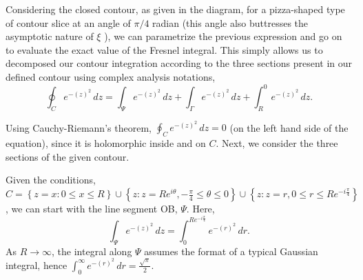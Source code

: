 \documentclass{article}
\begin{document}
Considering the closed contour, as given in the diagram, for a pizza-shaped type of contour slice at an angle of $\pi/4$ radian (this angle also buttresses the asymptotic nature of $\xi$ \cite{Tiscareno_2007}), we can parametrize the previous expression and go on to evaluate the exact value of the Fresnel integral. This simply allows us to decomposed our contour integration according to the three sections present in our defined contour using complex analysis notations,
\begin{equation}
    \oint_{C} e^{-(z)^{2}} \, dz = \int_{\Psi} e^{-(z)^{2}} \, dz + \int_{\Gamma} e^{-(z)^{2}} \, dz + \int_{R}^{0} e^{-(z)^{2}} \, dz.
\end{equation}


Using Cauchy-Riemann's theorem, $\oint_{C} e^{-(z)^{2}} \, dz = 0$ (on the left hand side of the equation), since it is holomorphic inside and on $C$. Next, we consider the three sections of the given contour.

Given the conditions, $C = \left\{ z = x : 0 \leq x \leq R \right\} \cup \left\{ z : z = Re^{i\theta}, -\frac{\pi}{4} \leq \theta \leq 0 \right\} \cup \left\{ z : z = r,  0 \leq r \leq Re^{-i\frac{\pi}{4}}\right\}$, we can start with the line segment OB, $\Psi$. Here, 
\begin{equation}
    \int_{\Psi} e^{-(z)^{2}} \, dz = \int_{0}^{Re^{-i\frac{\pi}{4}}} e^{-(r)^{2}} \, dr.
\end{equation}
As $R \rightarrow \infty$, the integral along $\Psi$ assumes the format of a typical Gaussian integral, hence $\int_{0}^{\infty} e^{-(r)^{2}}\, dr = \frac{\sqrt{\pi}}{2}$.
\end{document}
